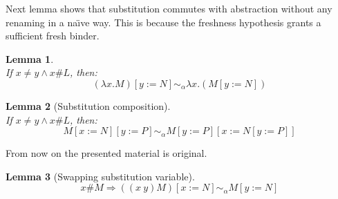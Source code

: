 \documentclass[preprint,10pt]{sigplanconf}
\newcommand{\lam}{\ensuremath{\lambda}}
\newcommand{\alpsym}{\ensuremath{\sim_\alpha}}
\newtheorem{lemma}{Lemma}
\begin{document}
Next lemma shows that substitution commutes with abstraction  without any renaming in a na\"\i ve way.
This is because the freshness hypothesis grants a sufficient fresh binder.

\begin{lemma}%
\hfill \\
  \label{naivesubst}
  If $x \neq y \wedge x \# L$, then:
    \[   (\lam x . M) [y {:=} N]  \alpsym \lam x .(M [y {:=} N])  \]
\end{lemma}


\begin{lemma}[Substitution composition]
\hfill \\
  \label{substcomp}
  If $x \neq y \wedge x\# L$, then:
    \[   M [x {:=} N] [y {:=} P] \alpsym M [y {:=} P] [x {:=} N [y {:=} P]]  \]
\end{lemma}

From now on the presented material is original. 


\begin{lemma}[Swapping substitution variable]
\label{pequiv}
\[ x \# M  \Rightarrow ((x\ y) M) [x{:=}N] \alpsym  M [y{:=} N] \]
\end{lemma}
\end{document}
